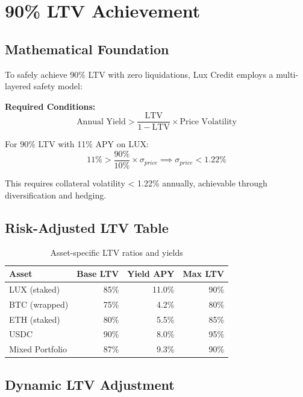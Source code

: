 \section{90\% LTV Achievement}


\subsection{Mathematical Foundation}

To safely achieve 90\% LTV with zero liquidations, Lux Credit employs a multi-layered safety model:

\textbf{Required Conditions:}
\begin{equation}
\text{Annual Yield} > \frac{\text{LTV}}{1 - \text{LTV}} \times \text{Price Volatility}
\end{equation}

For 90\% LTV with 11\% APY on LUX:
\begin{equation}
11\% > \frac{90\%}{10\%} \times \sigma_{price} \implies \sigma_{price} < 1.22\%
\end{equation}

This requires collateral volatility < 1.22\% annually, achievable through diversification and hedging.

\subsection{Risk-Adjusted LTV Table}

\begin{table}[h]
\centering
\begin{tabular}{@{}lrrr@{}}
\toprule
\textbf{Asset} & \textbf{Base LTV} & \textbf{Yield APY} & \textbf{Max LTV} \\ \midrule
LUX (staked) & 85\% & 11.0\% & 90\% \\
BTC (wrapped) & 75\% & 4.2\% & 80\% \\
ETH (staked) & 80\% & 5.5\% & 85\% \\
USDC & 90\% & 8.0\% & 95\% \\
Mixed Portfolio & 87\% & 9.3\% & 90\% \\ \bottomrule
\end{tabular}
\caption{Asset-specific LTV ratios and yields}
\end{table}

\subsection{Dynamic LTV Adjustment}

